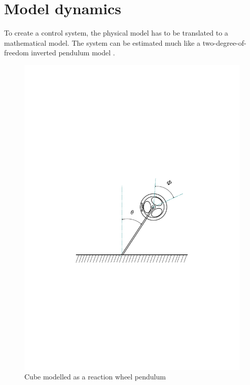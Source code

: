 \documentclass[a4paper,11pt]{kth-mag}
\begin{document}
\section{Model dynamics} \label{section: model dynamics}
To create a control system, the physical model has to be translated to a mathematical model. The system can be estimated much like a two-degree-of-freedom inverted pendulum model \cite{KTHpendulum}.
\begin{figure}[!htb]
\centering
\includegraphics[trim=5cm 9cm 5cm 9cm, clip=true,scale=.6]{Lagrangeflywheel2.pdf}
\caption{Cube modelled as a reaction wheel pendulum }
\label{fig:Lagrangeflywheel}
\end{figure}
\end{document}
